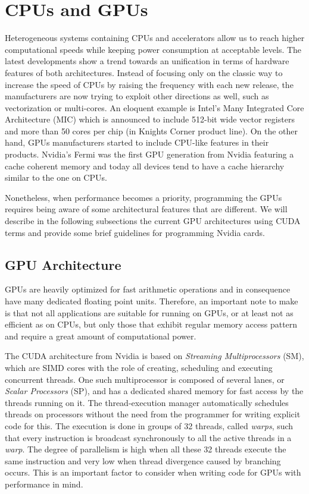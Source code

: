 \section{CPUs and GPUs}
\label{sec:cpus_vs_gpus}
Heterogeneous systems containing CPUs and accelerators allow us to reach higher
computational speeds while keeping power consumption at acceptable levels. The
latest developments show a trend towards an unification in terms of hardware
features of both architectures. Instead of focusing only on the classic way to
increase the speed of CPUs by raising the frequency with each new release, the
manufacturers are now trying to exploit other directions as well, such as
vectorization or multi-cores. An eloquent example is Intel's Many Integrated
Core Architecture (MIC) \cite{intel_mic} which is announced to include 512-bit
wide vector registers and more than 50 cores per chip (in Knights Corner product
line). On the other hand, GPUs manufacturers started to include CPU-like
features in their products. Nvidia's Fermi \cite{fermi} was the first GPU
generation from Nvidia featuring a cache coherent memory and today all devices
tend to have a cache hierarchy similar to the one on CPUs.

Nonetheless, when performance becomes a priority, programming the GPUs requires
being aware of some architectural features that are different. We will describe
in the following subsections the current GPU architectures using CUDA terms and
provide some brief guidelines for programming Nvidia cards.

\subsection{GPU Architecture}

GPUs are heavily optimized for fast arithmetic operations and in consequence
have many dedicated floating point units. Therefore, an important note to make
is that not all applications are suitable for running on GPUs, or at least not
as efficient as on CPUs, but only those that exhibit regular memory access
pattern and require a great amount of computational power.

The CUDA architecture from Nvidia is based on \textit{Streaming Multiprocessors}
(SM), which are SIMD cores with the role of creating, scheduling and executing
concurrent threads. One such multiprocessor is composed of several lanes, or
\textit{Scalar Processors} (SP), and has a dedicated shared memory for fast
access by the threads running on it. The thread-execution manager automatically
schedules threads on processors without the need from the programmer for writing
explicit code for this. The execution is done in groups of 32 threads, called
\textit{warps}, such that every instruction is broadcast synchronously to all
the active threads in a \textit{warp}. The degree of parallelism is high when
all these 32 threads execute the same instruction and very low when thread
divergence caused by branching occurs. This is an important factor to consider
when writing code for GPUs with performance in mind.

